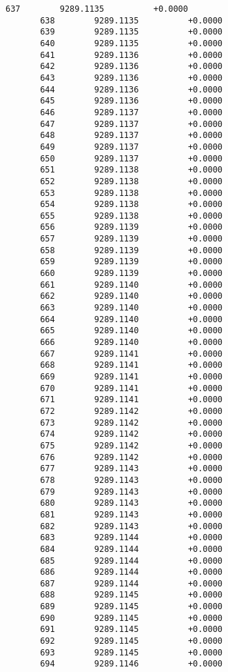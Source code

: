 \documentclass[11pt]{article}
\begin{document}
\begin{Verbatim}[commandchars=\\\{\}]
       637        9289.1135          +0.0000
       638        9289.1135          +0.0000
       639        9289.1135          +0.0000
       640        9289.1135          +0.0000
       641        9289.1136          +0.0000
       642        9289.1136          +0.0000
       643        9289.1136          +0.0000
       644        9289.1136          +0.0000
       645        9289.1136          +0.0000
       646        9289.1137          +0.0000
       647        9289.1137          +0.0000
       648        9289.1137          +0.0000
       649        9289.1137          +0.0000
       650        9289.1137          +0.0000
       651        9289.1138          +0.0000
       652        9289.1138          +0.0000
       653        9289.1138          +0.0000
       654        9289.1138          +0.0000
       655        9289.1138          +0.0000
       656        9289.1139          +0.0000
       657        9289.1139          +0.0000
       658        9289.1139          +0.0000
       659        9289.1139          +0.0000
       660        9289.1139          +0.0000
       661        9289.1140          +0.0000
       662        9289.1140          +0.0000
       663        9289.1140          +0.0000
       664        9289.1140          +0.0000
       665        9289.1140          +0.0000
       666        9289.1140          +0.0000
       667        9289.1141          +0.0000
       668        9289.1141          +0.0000
       669        9289.1141          +0.0000
       670        9289.1141          +0.0000
       671        9289.1141          +0.0000
       672        9289.1142          +0.0000
       673        9289.1142          +0.0000
       674        9289.1142          +0.0000
       675        9289.1142          +0.0000
       676        9289.1142          +0.0000
       677        9289.1143          +0.0000
       678        9289.1143          +0.0000
       679        9289.1143          +0.0000
       680        9289.1143          +0.0000
       681        9289.1143          +0.0000
       682        9289.1143          +0.0000
       683        9289.1144          +0.0000
       684        9289.1144          +0.0000
       685        9289.1144          +0.0000
       686        9289.1144          +0.0000
       687        9289.1144          +0.0000
       688        9289.1145          +0.0000
       689        9289.1145          +0.0000
       690        9289.1145          +0.0000
       691        9289.1145          +0.0000
       692        9289.1145          +0.0000
       693        9289.1145          +0.0000
       694        9289.1146          +0.0000

\end{Verbatim}
\end{document}

